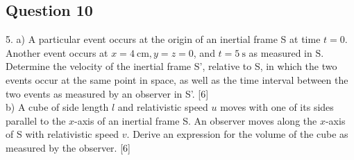 \documentclass{article}
\begin{document}
\subsection{Question 10}
5. a) A particular event occurs at the origin of an inertial frame S at time $t=0$. Another event occurs at $x=4 \mathrm{~cm}, y=z=0$, and $t=5 \mathrm{~s}$ as measured in $\mathrm{S} .$ Determine the velocity of the inertial frame S', relative to S, in which the two events occur at the same point in space, as well as the time interval between the two events as measured by an observer in S'. [6] \\
b) A cube of side length $l$ and relativistic speed $u$ moves with one of its sides parallel to the $x$-axis of an inertial frame S. An observer moves along the $x$-axis of S with relativistic speed $v$. Derive an expression for the volume of the cube as measured by the observer. [6]
\end{document}
